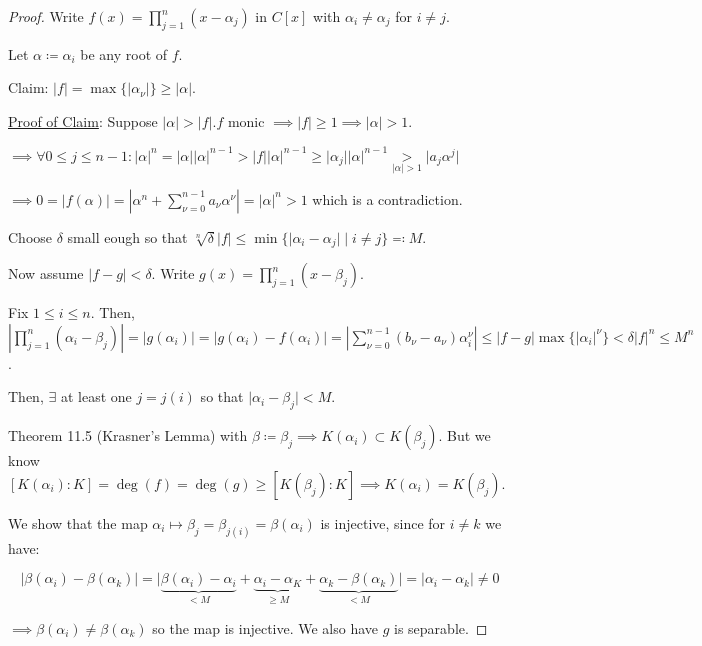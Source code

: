 \documentclass[openany]{amsbook}
\numberwithin{section}{chapter}
\theoremstyle{definition}
\begin{document}
\begin{proof}
    Write \(f(x) = \prod_{j=1}^n (x-\alpha_j)\) in \(C[x]\) with \(\alpha_i \neq \alpha_j\) for \(i\neq j\).

    Let \(\alpha \coloneqq \alpha_i\) be any root of \(f\).

    Claim: \(\vert f \vert = \max \{ \vert \alpha_\nu \vert \} \geq \vert \alpha \vert\).

    
    \underline{Proof of Claim}: Suppose \(\vert \alpha \vert > \vert f \vert. f\) monic \(\implies \vert f \vert \geq 1 \implies \vert \alpha \vert > 1\).

    \(\implies \forall 0 \leq j \leq n-1: \vert \alpha \vert ^ n = \vert \alpha \vert \vert \alpha \vert ^{n-1}> \vert f \vert \vert \alpha \vert^{n-1} \geq \vert \alpha_j \vert \vert \alpha \vert ^{n-1} \underset{\vert \alpha \vert > 1}{>} \vert a_j \alpha^j \vert\) 

    \(\implies 0 = \vert f(\alpha) \vert = \left\vert \alpha^n + \sum_{\nu=0}^{n-1} a_\nu \alpha^{\nu}  \right\vert = \vert \alpha \vert ^ n > 1\) which is a contradiction.
        
    Choose \(\delta\) small eough so that \(\sqrt[n]{\delta} \vert f \vert \leq \min\{ \vert \alpha_i - \alpha_j \vert \mid i \neq j \} \eqqcolon M\).
        
    Now assume \(\vert f-g \vert < \delta\). Write \(g(x) = \prod_{j=1}^n (x-\beta_j)\).

    Fix \(1 \leq i \leq n\). Then, \(\left\vert \prod_{j=1}^{n} (\alpha_i - \beta_j) \right\vert = \vert g(\alpha_i) \vert = \vert g(\alpha_i) - f(\alpha_i) \vert = \left\vert \sum_{\nu=0}^{n-1} (b_\nu - a_\nu) \alpha_i^{\nu}   \right\vert \leq \vert f-g \vert \max \{ \vert\alpha_i \vert ^\nu \} < \delta \vert f \vert^n \leq M^n\).
        
    Then, \(\exists\) at least one \(j = j(i)\) so that \(\vert \alpha_i - \beta_j \vert < M\).

    Theorem 11.5 (Krasner's Lemma) with \(\beta \coloneqq \beta_j\implies K(\alpha_i) \subset K(\beta_j)\). But we know \([K(\alpha_i):K] = \deg(f) = \deg(g) \geq [K(\beta_j) : K] \implies K(\alpha_i) = K(\beta_j)\).

    We show that the map \(\alpha_i \mapsto \beta_j = \beta_{j(i)} = \beta(\alpha_i)\) is injective, since for \(i \neq k\) we have:
        
    \[
        \vert \beta(\alpha_i) - \beta(\alpha_k) \vert = \vert \underbrace{\beta(\alpha_i)-\alpha_i}_{<M} + \underbrace{\alpha_i - \alpha_K}_{\geq M} + \underbrace{\alpha_k - \beta(\alpha_k)}_{<M} \vert = \vert \alpha_i - \alpha_k \vert \neq 0
    \]

    \(\implies \beta(\alpha_i) \neq \beta(\alpha_k)\) so the map is injective. We also have \(g\) is separable.
        
\end{proof}
\end{document}
